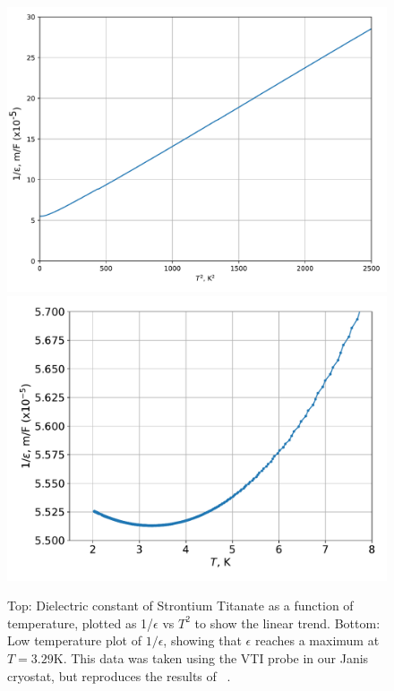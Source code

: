 \documentclass{thesis-umich}
\begin{document}
\begin{figure}
	\caption[Dielectric Constant of Strontium Titanate]{Top: Dielectric constant of Strontium Titanate as a function
		of temperature, plotted as 1/$\epsilon$ vs $T^2$ to show the
		linear trend. Bottom: Low temperature plot of $1/\epsilon$,
		showing that $\epsilon$ reaches a maximum at $T = 3.29$K. This
		data was taken using the VTI probe in our Janis cryostat, but
		reproduces the results of ~\cite{Rowley2014}.}
		\label{fig:sto_eps_vs_T}
		\centering
		\includegraphics[width=0.85\columnwidth]{figures/STO_eps_vs_T.pdf}
		\includegraphics[width=0.85\columnwidth]{figures/STO_eps_vs_T_low.pdf}
 \end{figure}
\end{document}
